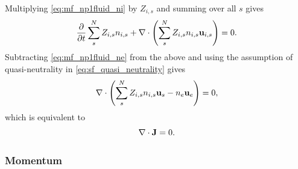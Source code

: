 \documentclass[a4paper,11pt]{report}
\begin{document}
Multiplying \cref{eq:mf_np1fluid_ni} by $Z_{i,s}$ and summing over all $s$ gives
\begin{equation*}
    \frac{\partial}{\partial t} \sum_s^N Z_{i,s} n_{i,s} + \nabla \cdot \left( \sum_s^N Z_{i,s} n_{i,s} \mathbf{u}_{i,s} \right) = 0.
\end{equation*}
Subtracting \cref{eq:mf_np1fluid_ne} from the above and using the assumption of quasi-neutrality in \cref{eq:sf_quasi_neutrality} gives
\begin{equation*}
    \nabla \cdot \left( \sum_s^N Z_{i,s} n_{i,s} \mathbf{u}_s - n_e \mathbf{u}_e \right) = 0,
\end{equation*}
which is equivalent to
\begin{equation}
    \nabla \cdot \mathbf{J} = 0.
\end{equation}

\subsubsection{Momentum}
\end{document}
